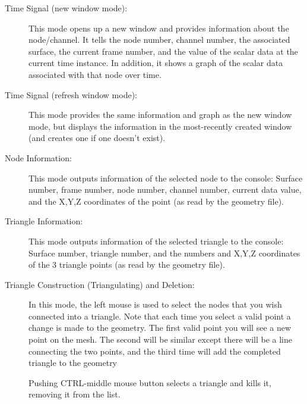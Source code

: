\begin{description}
  \item[Time Signal (new window mode): ] This mode opens up a new window
    and provides information about the node/channel.  It tells the node
    number, channel number, the associated surface, the current frame
    number, and the value of the scalar data at the current time instance.
    In addition, it shows a graph of the scalar data associated with that
    node over time.
    
  \item[Time Signal (refresh window mode): ] This mode provides the same
    information and graph as the new window mode, but displays the
    information in the most-recently created window (and creates one if one
    doesn't exist).
    
  \item[Node Information: ] This mode outputs information of the selected
    node to the console: Surface number, frame number, node number, channel
    number, current data value, and the X,Y,Z coordinates of the point (as
    read by the geometry file).
    
  \item[Triangle Information: ] This mode outputs information of the
    selected triangle to the console: Surface number, triangle number, and
    the numbers and X,Y,Z coordinates of the 3 triangle points (as read by
    the geometry file).

  \item[Triangle Construction (Triangulating) and Deletion: ]
    \label{sec:triangulate} 
    In this mode, the left mouse is used to select the nodes that you wish
    connected into a triangle.  Note that each time you select a valid
    point a change is made to the geometry.  The first valid point you will
    see a new point on the mesh.  The second will be similar except there
    will be a line connecting the two points, and the third time will add
    the completed triangle to the geometry

    Pushing CTRL-middle mouse button selects a triangle and kills it,
    removing it from the list.

    

\end{description}
